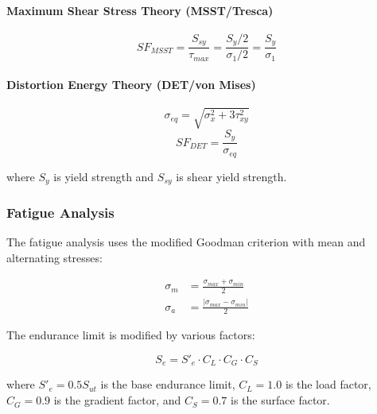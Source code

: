 \documentclass[11pt]{article}
\begin{document}
\paragraph{Maximum Shear Stress Theory (MSST/Tresca)}
\begin{equation}
SF_{MSST} = \frac{S_{sy}}{\tau_{max}} = \frac{S_y/2}{\sigma_1/2} = \frac{S_y}{\sigma_1}
\end{equation}

\paragraph{Distortion Energy Theory (DET/von Mises)}
\begin{equation}
\sigma_{eq} = \sqrt{\sigma_x^2 + 3\tau_{xy}^2}
\end{equation}
\begin{equation}
SF_{DET} = \frac{S_y}{\sigma_{eq}}
\end{equation}

where $S_y$ is yield strength and $S_{sy}$ is shear yield strength.

\subsubsection{Fatigue Analysis}

The fatigue analysis uses the modified Goodman criterion with mean and alternating stresses:

\begin{align}
\sigma_m &= \frac{\sigma_{max} + \sigma_{min}}{2} \\
\sigma_a &= \frac{|\sigma_{max} - \sigma_{min}|}{2}
\end{align}

The endurance limit is modified by various factors:

\begin{equation}
S_e = S'_e \cdot C_L \cdot C_G \cdot C_S
\end{equation}

where $S'_e = 0.5S_{ut}$ is the base endurance limit, $C_L = 1.0$ is the load factor, $C_G = 0.9$ is the gradient factor, and $C_S = 0.7$ is the surface factor.
\end{document}
